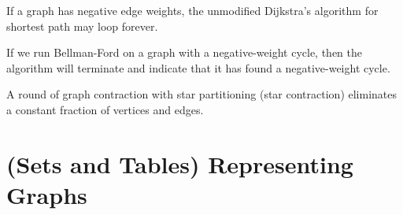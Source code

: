 \begin{problem}
\asktf

If a graph has negative edge weights, the unmodified Dijkstra's
algorithm for shortest path may loop forever.

\solf

\asktf

If we run Bellman-Ford on a graph with a negative-weight cycle, then
the algorithm will terminate and indicate that it has found a
negative-weight cycle.

\solf


\asktf 

A round of graph contraction with star partitioning (star contraction)
eliminates a constant fraction of vertices and edges.

\solf


\end{problem}

\section{(Sets and Tables) Representing Graphs}




